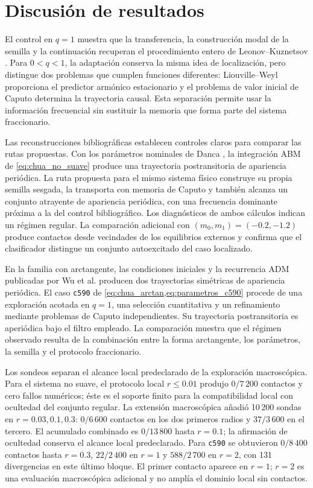 \section{Discusión de resultados}
\label{sec:discusion}

El control en \(q=1\) muestra que la transferencia, la construcción modal de
la semilla y la continuación recuperan el procedimiento entero de
Leonov--Kuznetsov \cite{LeonovKuznetsov2013,KuznetsovEtAl2017}. Para
\(0<q<1\), la adaptación conserva la misma idea de localización, pero distingue
dos problemas que cumplen funciones diferentes: Liouville--Weyl proporciona el
predictor armónico estacionario y el problema de valor inicial de Caputo
determina la trayectoria causal. Esta separación permite usar la información
frecuencial sin sustituir la memoria que forma parte del sistema fraccionario.

Las reconstrucciones bibliográficas establecen controles claros para comparar
las rutas propuestas. Con los parámetros nominales de Danca
\cite{Danca2017}, la integración ABM de \cref{eq:chua_no_suave} produce una
trayectoria postransitoria de apariencia periódica. La ruta propuesta para el
mismo sistema físico construye su propia semilla sesgada, la transporta con
memoria de Caputo y también alcanza un conjunto atrayente de apariencia
periódica, con una frecuencia dominante próxima a la del control
bibliográfico. Los diagnósticos de ambos cálculos indican un régimen regular. La
comparación adicional con
\((m_0,m_1)=(-0.2,-1.2)\) produce contactos desde vecindades de los
equilibrios externos y confirma que el clasificador distingue un conjunto
autoexcitado del caso localizado.

En la familia con arctangente, las condiciones iniciales y la recurrencia ADM
publicadas por Wu et al. \cite{Wu2023ArctanChua} producen dos trayectorias
simétricas de apariencia periódica. El caso \texttt{c590} de
\cref{eq:chua_arctan,eq:parametros_c590} procede de una exploración acotada en
\(q=1\), una selección cuantitativa y un refinamiento mediante problemas de
Caputo independientes. Su trayectoria postransitoria es aperiódica bajo el
filtro empleado. La comparación muestra que el régimen observado resulta de
la combinación entre la forma arctangente, los parámetros, la semilla y el
protocolo fraccionario.

\ifHAFOBasinMaterial
Los sondeos separan el alcance local predeclarado de la exploración
macroscópica. Para el sistema no suave, el protocolo local \(r\leq0.01\)
produjo \(0/7\,200\) contactos y cero fallos numéricos; éste es el soporte
finito para la compatibilidad local con ocultedad del conjunto regular. La
extensión macroscópica añadió 10\,200 sondas en \(r=0.03,0.1,0.3\):
\(0/6\,600\) contactos en los dos primeros radios y \(37/3\,600\) en el
tercero. El acumulado combinado es \(0/13\,800\) hasta \(r=0.1\); la afirmación
de ocultedad conserva el alcance local predeclarado. Para
\texttt{c590} se obtuvieron \(0/8\,400\) contactos hasta \(r=0.3\),
\(22/2\,400\) en \(r=1\) y \(588/2\,700\) en \(r=2\), con 131 divergencias
en este último bloque. El primer contacto aparece en \(r=1\); \(r=2\) es una
evaluación macroscópica adicional y no amplía el dominio local sin contactos.
\fi

